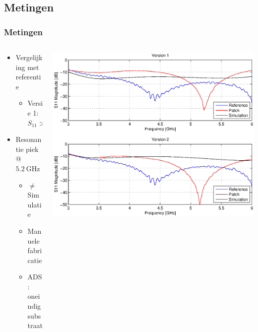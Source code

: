 \documentclass{beamer}
\begin{document}
\subsection{Metingen}
  \begin{frame}
  \frametitle{Metingen}

	  \begin{columns}[c]
	  \begin{column}{0.5\textwidth}
	  	\begin{itemize}
	  		\item Vergelijking met referentie
	  		\begin{itemize}
	  			\item Versie 1: $S_{11} > \SI{-10}{\decibel}$ 
	  		\end{itemize}
	  		\item Resonantie piek @ $\SI{5.2}{\giga\hertz}$  
	  		\begin{itemize}
	  			\item $\neq$ Simulatie
	  			\item Manuele fabricatie
	  			\item ADS: oneindig substraat
	  		\end{itemize}
	  	\end{itemize}
	  \end{column}%
	  \begin{column}{0.5\textwidth}
	  	\includegraphics[width=\textwidth]{images/antenna_comparison}
	  \end{column}
	  \end{columns}
  \end{frame}
\end{document}
